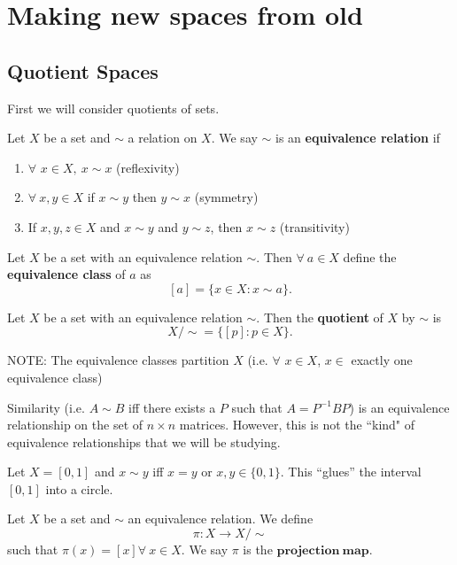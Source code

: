 

\chapter{Making new spaces from old} 
\section{Quotient Spaces}

First we will consider quotients of sets. 
\begin{definition}
	Let $X$ be a set and $\sim$ a relation on $X$. We say $\sim$ is an {\bf equivalence relation} if 
	\begin{enumerate}
		\item $\forall$ $x \in X, \ x\sim x$ (reflexivity) 
		\item $\forall \ x, y \in X$ if $x\sim y$ then $y\sim x$ (symmetry) 
		\item If $x, y, z \in X$ and $x\sim y$ and $y\sim z$, then $x\sim z$ (transitivity) 
	\end{enumerate}
\end{definition}
\begin{definition}
	Let $X$ be a set with an equivalence relation $\sim$. Then $\forall \ a \in X$ define the {\bf equivalence class} of $a$ as
	\[[a] = \{x \in X : x\sim a \}.\]
\end{definition}
\begin{definition}
	Let $X$ be a set with an equivalence relation $\sim$. Then the {\bf quotient} of $X$ by $\sim$ is
	\[X / \sim = \{ [p] : p \in X\}.\]
\end{definition}
NOTE: The equivalence classes partition $X$ (i.e. $\forall$ $x \in X$, $x \in$ exactly one equivalence class) 
\begin{example}
	Similarity (i.e. $A \sim B$ iff there exists a $P$ such that $A = P^{-1}BP$) is an equivalence relationship on the set of $n \times n$ matrices. However, this is not the ``kind" of equivalence relationships that we will be studying. 
\end{example}
\begin{example}
	Let $X = [0,1]$ and $x\sim y$ iff $x = y$ or $x,y \in \{0,1\}$. This ``glues'' the interval $[0,1]$ into a circle. 
\end{example}
\begin{definition}
	Let $X$ be a set and $\sim$ an equivalence relation. We define $$\pi: X \rightarrow X / \sim$$ such that $\pi(x) = [x] \forall \ x \in X$. We say $\pi$ is the $\mathbf{projection \ map}$. 
\end{definition}
